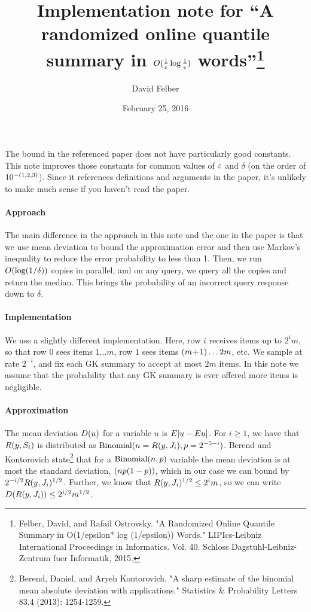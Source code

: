\documentclass{article}
\title{Implementation note for ``A randomized online quantile summary in
  $O(\frac{1}{\varepsilon} \log \frac{1}{\varepsilon})$ words''\footnote{Felber, David, and
    Rafail Ostrovsky. "A Randomized Online Quantile Summary in O(1/epsilon* log
    (1/epsilon)) Words." LIPIcs-Leibniz International Proceedings in
    Informatics. Vol. 40. Schloss Dagstuhl-Leibniz-Zentrum fuer Informatik,
    2015.}}
\author{David Felber}
\date{February 25, 2016}
\theoremstyle{plain}
\newcommand{\D}[1]{D\p{#1}}
\newcommand{\rank}[2]{R\p{#1,#2}}
\begin{document}
\maketitle


The bound in the referenced paper does not have particularly good constants.
This note improves those constants for common values of $\varepsilon$ and $\delta$ (on
the order of $10^{-(1,2,3)}$). Since it references definitions and arguments
in the paper, it's unlikely to make much sense if you haven't read the paper.

\paragraph{Approach}
The main difference in the approach in this note and the one in the paper is
that we use mean deviation to bound the approximation error and then use
Markov's inequality to reduce the error probability to less than 1. Then, we run
$O(\log(1/\delta))$ copies in parallel, and on any query, we query all the
copies and return the median. This brings the probability of an incorrect query
response down to $\delta$.

\paragraph{Implementation}
We use a slightly different implementation. Here, row $i$ receives items up to
$2^i m$, so that row $0$ sees items $1 \ldots m$, row $1$ sees items $(m \!+\!
  1) \ldots 2m$, etc. We sample at rate $2^{-i}$, and fix each GK summary to
accept at most $2m$ items. In this note we assume that the probability that any
GK summary is ever offered more items is negligible.

\paragraph{Approximation}
The mean deviation $\D{u}$ for a variable $u$ is $E|u - Eu|$. For $i \ge 1$,
we have that $\rank{y}{S_i}$ is distributed as $\text{Binomial}\p{n =
  \rank{y}{J_i}, p = 2^{-5-i}}$. Berend and Kontorovich state\footnote{Berend,
  Daniel, and Aryeh Kontorovich. "A sharp estimate of the binomial mean absolute
  deviation with applications." Statistics \& Probability Letters 83.4 (2013):
  1254-1259.} that for a $\text{Binomial}(n,p)$ variable the mean deviation is
at most the standard deviation, $(np(1-p))$, which in our case we can bound
by $2^{-i/2} \rank{y}{J_i}^{1/2}$. Further, we know that $\rank{y}{J_i}^{1/2}
\le 2^i m$, so we can write $\D{\rank{y}{J_i}} \le 2^{i/2} m^{1/2}$.
\end{document}
